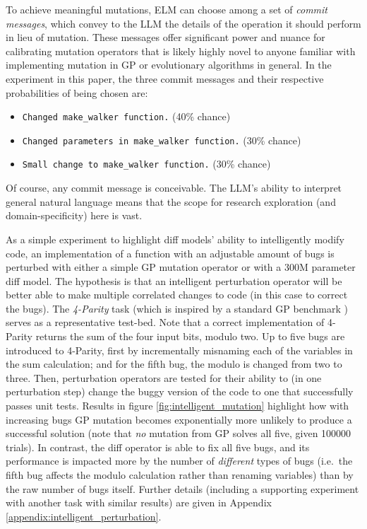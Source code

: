 \documentclass{article}
\begin{document}
To achieve meaningful mutations, ELM can choose among a set of \emph{commit messages}, which convey to the LLM the details of the operation it should perform in lieu of mutation.  These messages offer significant power and nuance for calibrating mutation operators that is likely highly novel to anyone familiar with implementing mutation in GP or evolutionary algorithms in general.  In the experiment in this paper, the three commit messages and their respective probabilities of being chosen are:
\begin{itemize}
    \item \texttt{Changed make\_walker function.} (40\% chance)
    \item \texttt{Changed parameters in make\_walker function.} (30\% chance)
    \item \texttt{Small change to make\_walker function.} (30\% chance)
\end{itemize}
Of course, any commit message is conceivable. The LLM's ability to interpret general natural language means that the scope for research exploration (and domain-specificity) here is vast.

As a simple experiment to highlight diff models' ability to intelligently modify code, an implementation of a function  with an adjustable amount of bugs is perturbed with either a simple GP mutation operator or with
a 300M parameter diff model. The hypothesis is that an intelligent perturbation operator will be better able to make multiple correlated changes to code (in this case to correct the bugs). The \emph{4-Parity} task (which is inspired by a standard GP benchmark \cite{koza:book92}) serves as a representative test-bed. Note that a correct implementation of 4-Parity returns the sum of the four input bits, modulo two. Up to five bugs are introduced to 4-Parity, first by incrementally misnaming each of the variables in the sum calculation; and for the fifth bug, the modulo is changed from two to three. Then, perturbation operators are tested for their ability to (in one perturbation step) change the buggy version of the code to one that successfully passes unit tests. Results in figure \ref{fig:intelligent_mutation} highlight how with increasing bugs GP mutation becomes exponentially more unlikely to produce a successful solution (note that \emph{no} mutation from GP solves all five, given \num{100000} trials). In contrast, the diff operator is able to fix all five bugs, and its performance is impacted more by the number of \emph{different} types of bugs (i.e.\ the fifth bug affects the modulo calculation rather than renaming variables)  than by the raw number of bugs itself. Further details (including a supporting experiment with another task with similar results) are given in Appendix \ref{appendix:intelligent_perturbation}.
\end{document}
